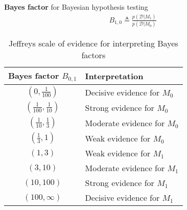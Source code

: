 \textbf{Bayes factor} for Bayesian hypothesis testing
\begin{gather}
    B_{1,0}\triangleq\frac{p(\mathcal{D}|M_1)}{p(\mathcal{D}|M_0)}
\end{gather}

\begin{table}[htbp]
    \centering
    \begin{tabular}{cl}
    \toprule
    Bayes factor $B_{0,1}$                      & Interpretation \\
    \midrule
    $(0,\frac{1}{100})$                         & Decisive evidence for $M_0$ \\
    $(\frac{1}{100},\frac{1}{10})$              & Strong evidence for $M_0$ \\
    $(\frac{1}{10},\frac{1}{3})$                & Moderate evidence for $M_0$ \\
    $(\frac{1}{3},1)$                           & Weak evidence for $M_0$ \\
    $(1,3)$                                     & Weak evidence for $M_1$ \\
    $(3,10)$                                    & Moderate evidence for $M_1$ \\
    $(10,100)$                                  & Strong evidence for $M_1$ \\
    $(100,\infty)$                              & Decisive evidence for $M_1$ \\
    \bottomrule
    \end{tabular}
    \caption{Jeffreys scale of evidence for interpreting Bayes factors}
    \label{tab:bayesfactor}
\end{table}

